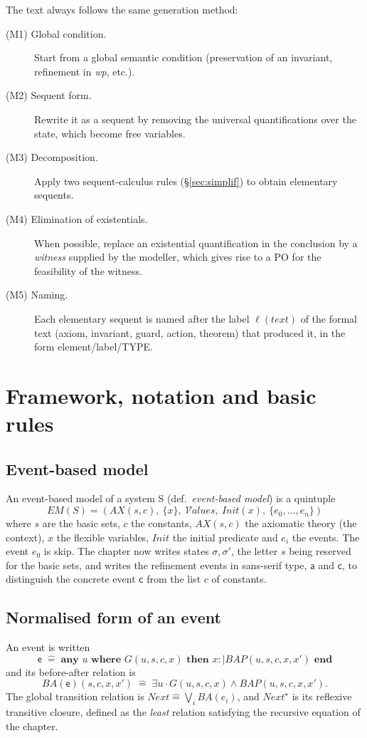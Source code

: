 \documentclass[11pt,a4paper]{article}
\newcommand{\BA}{\mathit{BA}}
\newcommand{\AX}{\mathit{AX}(s,c)}
\newcommand{\sff}[1]{\textsf{#1}}
\newcommand{\po}[1]{\textsf{\small #1}}
\begin{document}
The text always follows the same generation method:
\begin{description}
  \item[(M1) Global condition.] Start from a global semantic condition
    (preservation of an invariant, refinement in \emph{wp}, etc.).
  \item[(M2) Sequent form.] Rewrite it as a sequent by removing the universal
    quantifications over the state, which become free variables.
  \item[(M3) Decomposition.] Apply two sequent-calculus rules
    (§\ref{sec:simplif}) to obtain elementary sequents.
  \item[(M4) Elimination of existentials.] When possible, replace an existential
    quantification in the conclusion by a \emph{witness} supplied by the modeller,
    which gives rise to a PO for the feasibility of the witness.
  \item[(M5) Naming.] Each elementary sequent is named after the label
    $\ell(\mathit{text})$ of the formal text (axiom, invariant, guard, action,
    theorem) that produced it, in the form \po{element/label/TYPE}.
\end{description}

\section{Framework, notation and basic rules}

\subsection{Event-based model}
An event-based model of a system \textsc{S} (def.~\emph{event-based model}) is a
quintuple
\[
  \mathit{EM}(S) = (\AX,\ \{x\},\ \mathcal{V}\!\mathit{alues},\ \mathit{Init}(x),\ \{e_0,\dots,e_n\})
\]
where $s$ are the basic sets, $c$ the constants, $\AX$ the axiomatic theory (the
context), $x$ the flexible variables, $\mathit{Init}$ the initial predicate and
$e_i$ the events. The event $e_0$ is \sff{skip}. The chapter now writes states
$\sigma,\sigma'$, the letter $s$ being reserved for the basic sets,
and writes the refinement events in sans-serif type, $\mathsf{a}$ and $\mathsf{c}$,
to distinguish the concrete event $\mathsf{c}$ from the list $c$ of constants.

\subsection{Normalised form of an event}\label{sec:forme}
An event is written
\[
  \sff{e} \;\widehat{=}\; \textbf{any } u \textbf{ where } G(u,s,c,x)
  \textbf{ then } x :\mid \mathit{BAP}(u,s,c,x,x') \textbf{ end}
\]
and its before-after relation is
\[
  \BA(\sff{e})(s,c,x,x') \;\widehat{=}\; \exists u\cdot G(u,s,c,x) \wedge \mathit{BAP}(u,s,c,x,x').
\]
The global transition relation is $\mathit{Next} \widehat{=} \bigvee_{i} \BA(e_i)$,
and $\mathit{Next}^\star$ is its reflexive transitive closure, defined as the
\emph{least} relation satisfying the recursive equation of the chapter.
\end{document}
